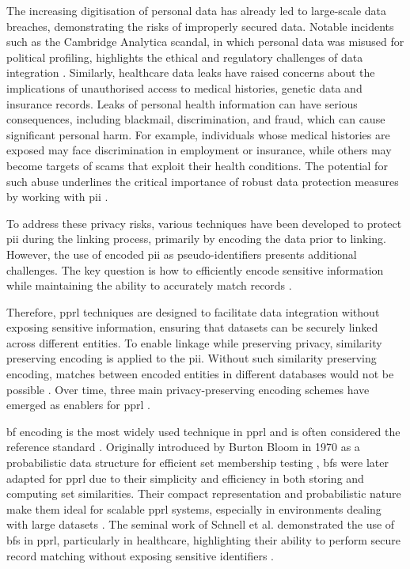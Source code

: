 The increasing digitisation of personal data has already led to large-scale data breaches, demonstrating the risks of improperly secured data.
Notable incidents such as the Cambridge Analytica scandal, in which personal data was misused for political profiling, highlights the ethical and regulatory challenges of data integration \cite{isaak2018user}.
Similarly, healthcare data leaks have raised concerns about the implications of unauthorised access to medical histories, genetic data and insurance records.
Leaks of personal health information can have serious consequences, including blackmail, discrimination, and fraud, which can cause significant personal harm.
For example, individuals whose medical histories are exposed may face discrimination in employment or insurance, while others may become targets of scams that exploit their health conditions.
The potential for such abuse underlines the critical importance of robust data protection measures by working with \ac{pii} \cite{smith2016examining}.

To address these privacy risks, various techniques have been developed to protect \ac{pii} during the linking process, primarily by encoding the data prior to linking.
However, the use of encoded \ac{pii} as pseudo-identifiers presents additional challenges.
The key question is how to efficiently encode sensitive information while maintaining the ability to accurately match records \cite{schnell2009privacy}.

Therefore, \ac{pprl} techniques are designed to facilitate data integration without exposing sensitive information, ensuring that datasets can be securely linked across different entities.
To enable linkage while preserving privacy, similarity preserving encoding is applied to the \ac{pii}.
Without such similarity preserving encoding, matches between encoded entities in different databases would not be possible \cite{schnell2009privacy, vatsalan2017privacy}.
Over time, three main privacy-preserving encoding schemes have emerged as enablers for \ac{pprl} \cite{vidanage2020graph, schaefer2024}.

\ac{bf} encoding is the most widely used technique in \ac{pprl} and is often considered the reference standard \cite{schaefer2024}.
Originally introduced by Burton Bloom in 1970 as a probabilistic data structure for efficient set membership testing \cite{bloom1970space}, \ac{bf}s were later adapted for \ac{pprl} due to their simplicity and efficiency in both storing and computing set similarities.
Their compact representation and probabilistic nature make them ideal for scalable \ac{pprl} systems, especially in environments dealing with large datasets \cite{schnell2009privacy}.
The seminal work of Schnell et al. \cite{schnell2009privacy} demonstrated the use of \ac{bf}s in \ac{pprl}, particularly in healthcare, highlighting their ability to perform secure record matching without exposing sensitive identifiers \cite{schnell2009privacy}.

